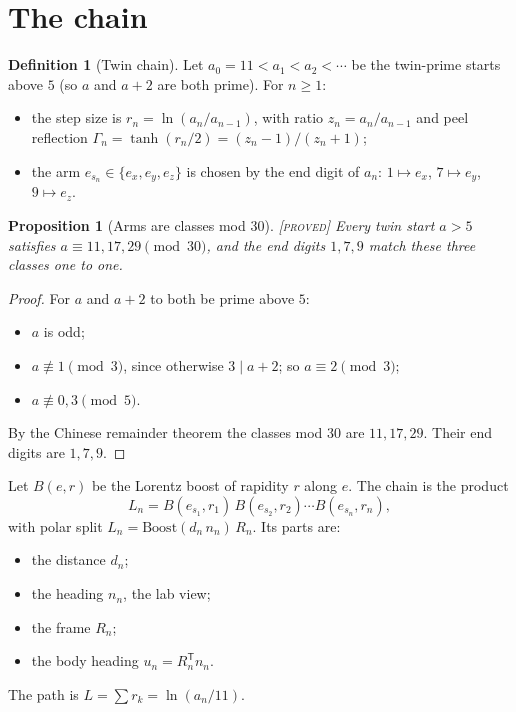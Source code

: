 \documentclass[11pt]{article}
\newtheorem{proposition}{Proposition}
\theoremstyle{definition}
\newtheorem{definition}{Definition}
\theoremstyle{remark}
\newcommand{\grade}[1]{\textsc{[#1]}}
\begin{document}
\section{The chain}

\begin{definition}[Twin chain]
Let $a_0=11<a_1<a_2<\cdots$ be the twin-prime starts above $5$ (so $a$ and $a+2$ are both prime). For $n\ge1$:
\begin{itemize}
\item the step size is $r_n=\ln(a_n/a_{n-1})$, with ratio $z_n=a_n/a_{n-1}$ and peel reflection $\Gamma_n=\tanh(r_n/2)=(z_n-1)/(z_n+1)$;
\item the arm $e_{s_n}\in\{e_x,e_y,e_z\}$ is chosen by the end digit of $a_n$: $1\mapsto e_x$, $7\mapsto e_y$, $9\mapsto e_z$.
\end{itemize}
\end{definition}

\begin{proposition}[Arms are classes mod 30] \grade{proved}
Every twin start $a>5$ satisfies $a\equiv 11,17,29\pmod{30}$, and the end digits $1,7,9$ match these three classes one to one.
\end{proposition}
\begin{proof}
For $a$ and $a+2$ to both be prime above $5$:
\begin{itemize}
\item $a$ is odd;
\item $a\not\equiv 1\pmod 3$, since otherwise $3\mid a+2$; so $a\equiv 2\pmod3$;
\item $a\not\equiv 0,3\pmod 5$.
\end{itemize}
By the Chinese remainder theorem the classes mod 30 are $11,17,29$. Their end digits are $1,7,9$.
\end{proof}

Let $B(e,r)$ be the Lorentz boost of rapidity $r$ along $e$. The chain is the product
\[
L_n=B(e_{s_1},r_1)\,B(e_{s_2},r_2)\cdots B(e_{s_n},r_n),
\]
with polar split $L_n=\mathrm{Boost}(d_n\,n_n)\,R_n$. Its parts are:
\begin{itemize}
\item the distance $d_n$;
\item the heading $n_n$, the lab view;
\item the frame $R_n$;
\item the body heading $u_n=R_n^{\mathsf T}n_n$.
\end{itemize}
The path is $L=\sum r_k=\ln(a_n/11)$.
\end{document}
